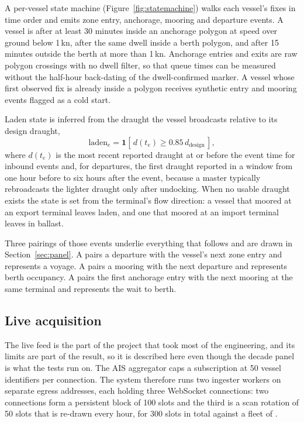 A per-vessel state machine (Figure~\ref{fig:statemachine}) walks each vessel's
fixes in time order and emits zone entry, anchorage, mooring and departure events.
A vessel is  after at least 30 minutes inside an anchorage polygon at
speed over ground below 1\,kn,  after the same dwell inside a berth
polygon, and  after 15 minutes outside the berth at more than 1\,kn.
Anchorage entries and exits are raw polygon crossings with no dwell filter, so
that queue times can be measured without the half-hour back-dating of the
dwell-confirmed marker. A vessel whose first observed fix is already inside a
polygon receives synthetic entry and mooring events flagged as a cold start.

Laden state is inferred from the draught the vessel broadcasts relative to its
design draught,
\begin{equation}
  \text{laden}_e = \mathbf{1}\!\left[\, d(t_e) \ge 0.85\, d_{\mathrm{design}} \,\right],
  \label{eq:laden}
\end{equation}
where $d(t_e)$ is the most recent reported draught at or before the event time
for inbound events and, for departures, the first draught reported in a window
from one hour before to six hours after the event, because a master typically
rebroadcasts the lighter draught only after undocking. When no usable draught
exists the state is set from the terminal's flow direction: a vessel that moored at
an export terminal leaves laden, and one that moored at an import terminal leaves
in ballast.

Three pairings of those events underlie everything that follows and are drawn in
Section~\ref{sec:panel}. A  pairs a departure with the vessel's next zone
entry and represents a voyage. A  pairs a mooring with the next departure
and represents berth occupancy. A  pairs the first anchorage entry with
the next mooring at the same terminal and represents the wait to berth.

\subsection{Live acquisition}\label{sec:live}

The live feed is the part of the project that took most of the engineering, and its
limits are part of the result, so it is described here even though the decade
panel is what the tests run on. The AIS aggregator caps a subscription at 50 vessel
identifiers per connection. The system therefore runs two ingester workers on
separate egress addresses, each holding three WebSocket connections: two connections
form a persistent block of 100 slots and the third is a scan rotation of 50 slots
that is re-drawn every hour, for 300 slots in total against a fleet of \nFleet.

